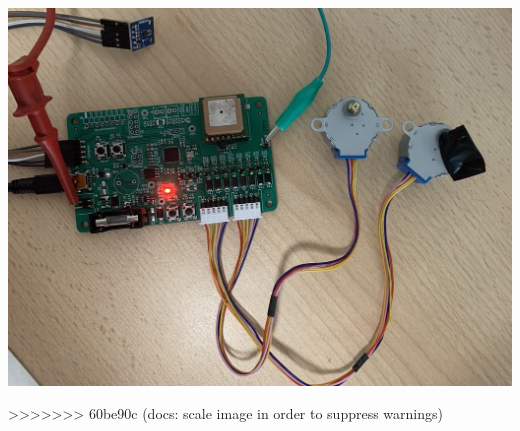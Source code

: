 \begin{center}
\includegraphics[scale=0.35]{figures/image101.png}
\captionsetup{type=figure}
\end{center}
>>>>>>> 60be90c (docs: scale image in order to suppress warnings)
